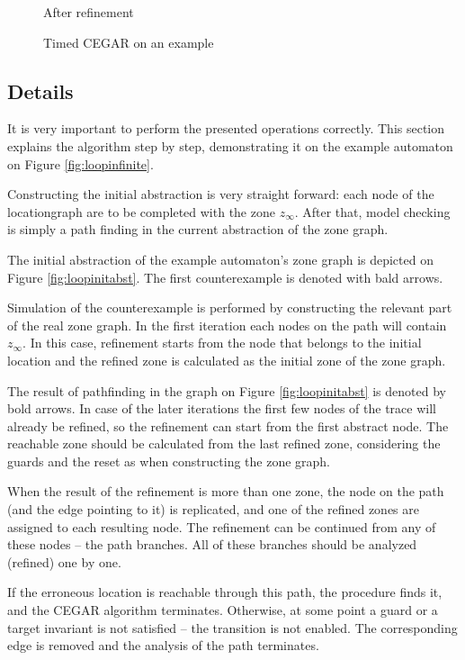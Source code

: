 \begin{figure} [h]
\begin{minipage} {0.25\linewidth}
 		\vspace*{5pt}%
 		\caption{After refinement}
 		\label{fig:loopref}
 	\end{minipage}
 	\caption{Timed CEGAR on an example}
 \end{figure}
 
 
\subsection{Details}

It is very important to perform the presented operations correctly. This section explains the algorithm step by step, demonstrating it on the example automaton on Figure \ref{fig:loopinfinite}.

Constructing the initial abstraction is very straight forward: each node of the locationgraph are to be completed with the zone $z_\infty$. After that, model checking is simply a path finding in the current abstraction of the zone graph.

\begin{example}
	The initial abstraction of the example automaton's zone graph is depicted on Figure \ref{fig:loopinitabst}. The first counterexample is denoted with bald arrows.
\end{example}

Simulation of the counterexample is performed by constructing the relevant part of the real zone graph. In the first iteration each nodes on the path will contain $z_\infty$. In this case, refinement starts from the node that belongs to the initial location and the refined zone is calculated as the initial zone of the zone graph.

The result of pathfinding in the graph on Figure \ref{fig:loopinitabst} is denoted by bold arrows. In case of the later iterations the first few nodes of the
trace will already be refined, so the refinement can start from the first
abstract node. The reachable zone should be calculated from the last refined zone,
considering the guards and the reset as when constructing the zone graph.

When the result of the refinement is more than one zone, the node on the path (and the edge pointing
to it) is replicated, and one of the refined zones are assigned
to each resulting node. The refinement can be continued from any of these nodes -- the path branches.
All of these branches should be analyzed (refined) one by one.

If the erroneous location is reachable through this path, the procedure finds it,
and the CEGAR algorithm terminates. Otherwise, at some point a guard or a target invariant
is not satisfied -- the transition is not enabled. The corresponding edge is removed and the analysis of the path terminates.

